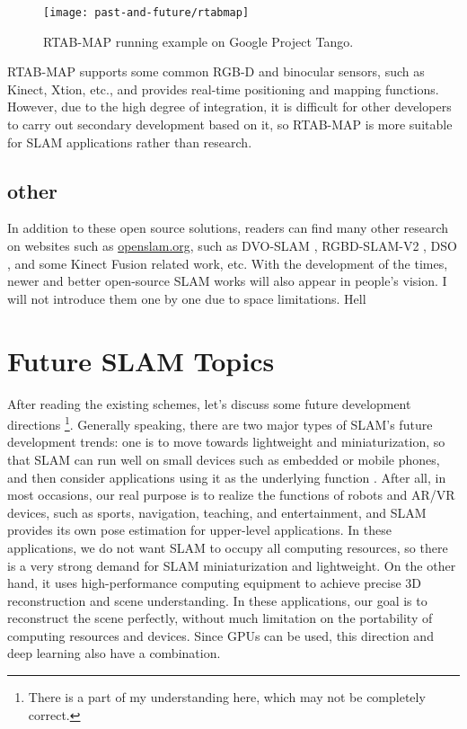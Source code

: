 \begin{figure}[! ht]
\centering
\texttt{[image: past-and-future/rtabmap]}
\caption{RTAB-MAP running example on Google Project Tango. }
\label{fig: rtabmap}
\end{figure}

RTAB-MAP supports some common RGB-D and binocular sensors, such as Kinect, Xtion, etc., and provides real-time positioning and mapping functions. However, due to the high degree of integration, it is difficult for other developers to carry out secondary development based on it, so RTAB-MAP is more suitable for SLAM applications rather than research.

\subsection{other}
In addition to these open source solutions, readers can find many other research on websites such as \url{openslam.org}, such as DVO-SLAM \textsuperscript{\cite{Kerl2013a}}, RGBD-SLAM-V2 \textsuperscript{\cite{Endres2014}}, DSO \textsuperscript{\cite{Engel2016}}, and some Kinect Fusion related work, etc. With the development of the times, newer and better open-source SLAM works will also appear in people's vision. I will not introduce them one by one due to space limitations.
Hell

\section{Future SLAM Topics}
After reading the existing schemes, let's discuss some future development directions \footnote{There is a part of my understanding here, which may not be completely correct. }. Generally speaking, there are two major types of SLAM's future development trends: one is to move towards lightweight and miniaturization, so that SLAM can run well on small devices such as embedded or mobile phones, and then consider applications using it as the underlying function . After all, in most occasions, our real purpose is to realize the functions of robots and AR/VR devices, such as sports, navigation, teaching, and entertainment, and SLAM provides its own pose estimation for upper-level applications. In these applications, we do not want SLAM to occupy all computing resources, so there is a very strong demand for SLAM miniaturization and lightweight. On the other hand, it uses high-performance computing equipment to achieve precise 3D reconstruction and scene understanding. In these applications, our goal is to reconstruct the scene perfectly, without much limitation on the portability of computing resources and devices. Since GPUs can be used, this direction and deep learning also have a combination.

